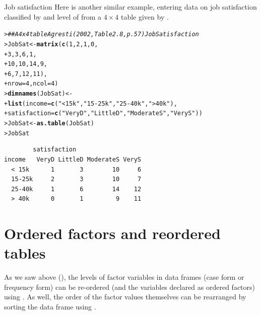 \documentclass[10pt,krantz2]{krantz}\usepackage[]{graphicx}\usepackage[]{color}
\makeatletter
\newcommand{\hlnum}[1]{\textcolor[rgb]{0.686,0.059,0.569}{#1}}%
\newcommand{\hlstr}[1]{\textcolor[rgb]{0.192,0.494,0.8}{#1}}%
\newcommand{\hlcom}[1]{\textcolor[rgb]{0.678,0.584,0.686}{\textit{#1}}}%
\newcommand{\hlstd}[1]{\textcolor[rgb]{0.345,0.345,0.345}{#1}}%
\newcommand{\hlkwb}[1]{\textcolor[rgb]{0.69,0.353,0.396}{#1}}%
\newcommand{\hlkwc}[1]{\textcolor[rgb]{0.333,0.667,0.333}{#1}}%
\newcommand{\hlkwd}[1]{\textcolor[rgb]{0.737,0.353,0.396}{\textbf{#1}}}%
\newenvironment{kframe}{%
 \def\at@end@of@kframe{}%
 \ifinner\ifhmode%
  \def\at@end@of@kframe{\end{minipage}}%
  \begin{minipage}{\columnwidth}%
 \fi\fi%
 \def\FrameCommand##1{\hskip\@totalleftmargin \hskip-\fboxsep
 \colorbox{shadecolor}{##1}\hskip-\fboxsep
     \hskip-\linewidth \hskip-\@totalleftmargin \hskip\columnwidth}%
 \MakeFramed {\advance\hsize-\width
   \@totalleftmargin\z@ \linewidth\hsize
   \@setminipage}}%
 {\par\unskip\endMakeFramed%
 \at@end@of@kframe}
\newenvironment{knitrout}{}{} %
\renewenvironment{knitrout}{\small\renewcommand{\baselinestretch}{.85}}{} %
\makeatother
\begin{document}
\begin{Example}[jobsat1]{Job satisfaction}
Here is another similar example, entering data on job satisfaction
classified by  and level of 
from a $4 \times 4$ table given by \citet[Table 2.8, p. 57]{Agresti:2002}.
\begin{knitrout}
\color{fgcolor}\begin{kframe}
\begin{alltt}
\hlstd{> }\hlcom{## A 4 x 4 table  Agresti (2002, Table 2.8, p. 57) Job Satisfaction}
\hlstd{> }\hlstd{JobSat} \hlkwb{<-} \hlkwd{matrix}\hlstd{(}\hlkwd{c}\hlstd{(}\hlnum{1}\hlstd{,} \hlnum{2}\hlstd{,} \hlnum{1}\hlstd{,} \hlnum{0}\hlstd{,}
\hlstd{+ }                   \hlnum{3}\hlstd{,} \hlnum{3}\hlstd{,} \hlnum{6}\hlstd{,} \hlnum{1}\hlstd{,}
\hlstd{+ }                   \hlnum{10}\hlstd{,} \hlnum{10}\hlstd{,} \hlnum{14}\hlstd{,} \hlnum{9}\hlstd{,}
\hlstd{+ }                   \hlnum{6}\hlstd{,} \hlnum{7}\hlstd{,} \hlnum{12}\hlstd{,} \hlnum{11}\hlstd{),}
\hlstd{+ }                  \hlkwc{nrow} \hlstd{=} \hlnum{4}\hlstd{,} \hlkwc{ncol} \hlstd{=} \hlnum{4}\hlstd{)}
\hlstd{> }\hlkwd{dimnames}\hlstd{(JobSat)} \hlkwb{<-}
\hlstd{+ }  \hlkwd{list}\hlstd{(}\hlkwc{income} \hlstd{=} \hlkwd{c}\hlstd{(}\hlstr{"< 15k"}\hlstd{,} \hlstr{"15-25k"}\hlstd{,} \hlstr{"25-40k"}\hlstd{,} \hlstr{"> 40k"}\hlstd{),}
\hlstd{+ }       \hlkwc{satisfaction} \hlstd{=} \hlkwd{c}\hlstd{(}\hlstr{"VeryD"}\hlstd{,} \hlstr{"LittleD"}\hlstd{,} \hlstr{"ModerateS"}\hlstd{,} \hlstr{"VeryS"}\hlstd{))}
\hlstd{> }\hlstd{JobSat} \hlkwb{<-} \hlkwd{as.table}\hlstd{(JobSat)}
\hlstd{> }\hlstd{JobSat}
\end{alltt}
\begin{verbatim}
        satisfaction
income   VeryD LittleD ModerateS VeryS
  < 15k      1       3        10     6
  15-25k     2       3        10     7
  25-40k     1       6        14    12
  > 40k      0       1         9    11
\end{verbatim}
\end{kframe}
\end{knitrout}
\end{Example}

\section{Ordered factors and reordered tables}\label{sec:ordered}
As we saw above (), the levels of factor variables in
data frames (case form or frequency form)
can be re-ordered (and the variables 
declared as ordered factors) using .
As well, the order of the factor values themselves can be rearranged by
sorting the data frame using .
\end{document}

